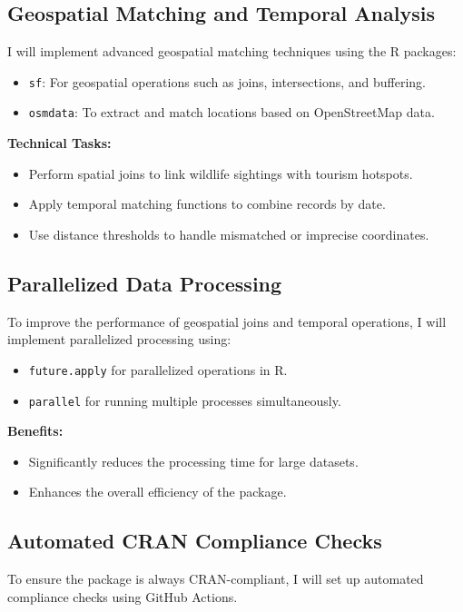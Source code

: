 \documentclass{article}
\newcommand{\code}[1]{\colorbox{customgray}{\texttt{#1}}}
\begin{document}
\subsection{Geospatial Matching and Temporal Analysis}
I will implement advanced geospatial matching techniques using the R packages:
\begin{itemize}
    \item \code{sf}: For geospatial operations such as joins, intersections, and buffering.
    \item \code{osmdata}: To extract and match locations based on OpenStreetMap data.
\end{itemize}

\textbf{Technical Tasks:}
\begin{itemize}
    \item Perform spatial joins to link wildlife sightings with tourism hotspots.
    \item Apply temporal matching functions to combine records by date.
    \item Use distance thresholds to handle mismatched or imprecise coordinates.
\end{itemize}

\subsection{Parallelized Data Processing}
To improve the performance of geospatial joins and temporal operations, I will implement parallelized processing using:
\begin{itemize}
    \item \code{future.apply} for parallelized operations in R.
    \item \code{parallel} for running multiple processes simultaneously.
\end{itemize}

\textbf{Benefits:}
\begin{itemize}
    \item Significantly reduces the processing time for large datasets.
    \item Enhances the overall efficiency of the package.
\end{itemize}

\subsection{Automated CRAN Compliance Checks}
To ensure the package is always CRAN-compliant, I will set up automated compliance checks using GitHub Actions.
\end{document}
